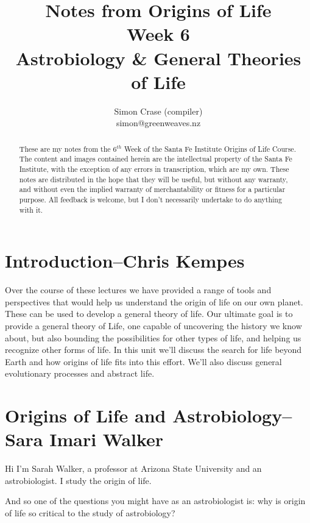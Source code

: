 \documentclass[]{article}
\title{
	Notes from Origins of Life\\
	Week 6\\
	 Astrobiology \& General Theories of Life
}
\author{Simon Crase (compiler)\\simon@greenweaves.nz}
\begin{document}
\maketitle

\begin{abstract}
   These are my notes from the $6^{th}$ Week of the Santa Fe Institute Origins of Life Course\cite{sfi2020}. 
   The content and images contained herein are the intellectual property of the Santa Fe Institute, with the exception of any errors in transcription, which are my own.
   These notes are distributed in the hope that they will be useful,
   but without any warranty, and without even the implied warranty of
   merchantability or fitness for a particular purpose. All feedback is welcome,
   but I don't necessarily undertake to do anything with it.

\end{abstract}

\setcounter{tocdepth}{2}
\tableofcontents

\listoffigures

\section[Introduction]{Introduction--Chris Kempes}

Over the course of these lectures we have provided a range of tools and perspectives that would help us understand the origin of life on our own planet. These can be used to develop a general theory of life. Our ultimate goal is to provide a general theory of Life, one capable of uncovering the history we know about, but also bounding the possibilities for other types of life, and helping us recognize other forms of life. In this unit we'll discuss the search for life beyond Earth and how origins of life fits into this effort. We'll also discuss general evolutionary processes and abstract life. 

\section[Origins of Life and Astrobiology]{Origins of Life and Astrobiology-- Sara Imari Walker}

Hi I'm Sarah Walker, a professor at Arizona State University and an astrobiologist.
I study the origin of life.

And so one of the questions you might have as an astrobiologist is: why is origin of life so critical to the study of astrobiology?
\end{document}
